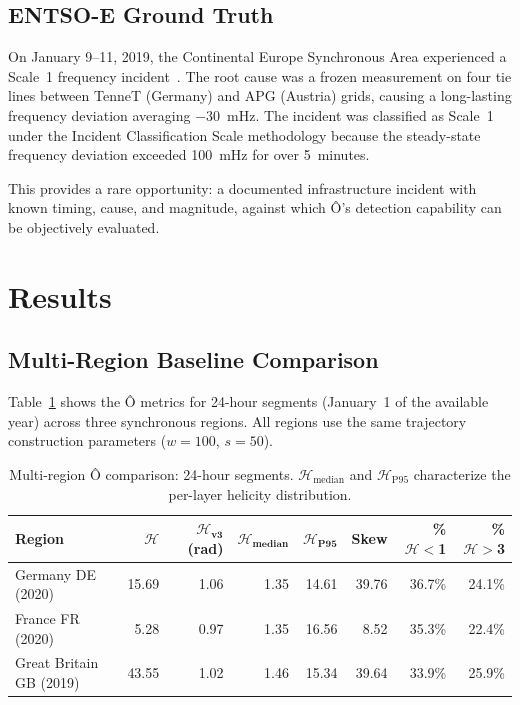 \documentclass[11pt,a4paper]{article}
\begin{document}
\subsection{ENTSO-E Ground Truth}

On January 9--11, 2019, the Continental Europe Synchronous Area experienced a Scale~1 frequency incident~\cite{entsoe_2019_freq}. The root cause was a frozen measurement on four tie lines between TenneT (Germany) and APG (Austria) grids, causing a long-lasting frequency deviation averaging $-30$~mHz. The incident was classified as Scale~1 under the Incident Classification Scale methodology because the steady-state frequency deviation exceeded 100~mHz for over 5~minutes.

This provides a rare opportunity: a documented infrastructure incident with known timing, cause, and magnitude, against which Ô's detection capability can be objectively evaluated.

\section{Results}

\subsection{Multi-Region Baseline Comparison}

Table~\ref{tab:multiregion} shows the Ô metrics for 24-hour segments (January~1 of the available year) across three synchronous regions. All regions use the same trajectory construction parameters ($w=100$, $s=50$).

\begin{table}[H]
\centering
\caption{Multi-region Ô comparison: 24-hour segments. $\mathcal{H}_{\text{median}}$ and $\mathcal{H}_{\text{P95}}$ characterize the per-layer helicity distribution.}
\label{tab:multiregion}
\begin{tabular}{lrrrrrrr}
\toprule
\textbf{Region} & $\boldsymbol{\mathcal{H}}$ & $\boldsymbol{\mathcal{H}_{\text{v3}}}$ (rad) & $\boldsymbol{\mathcal{H}_{\text{median}}}$ & $\boldsymbol{\mathcal{H}_{\text{P95}}}$ & \textbf{Skew} & \textbf{\%$\mathcal{H}<$1} & \textbf{\%$\mathcal{H}>$3} \\
\midrule
Germany DE (2020) & 15.69 & 1.06 & 1.35 & 14.61 & 39.76 & 36.7\% & 24.1\% \\
France FR (2020)   &  5.28 & 0.97 & 1.35 & 16.56 &  8.52 & 35.3\% & 22.4\% \\
Great Britain GB (2019) & 43.55 & 1.02 & 1.46 & 15.34 & 39.64 & 33.9\% & 25.9\% \\
\bottomrule
\end{tabular}
\end{table}
\end{document}
